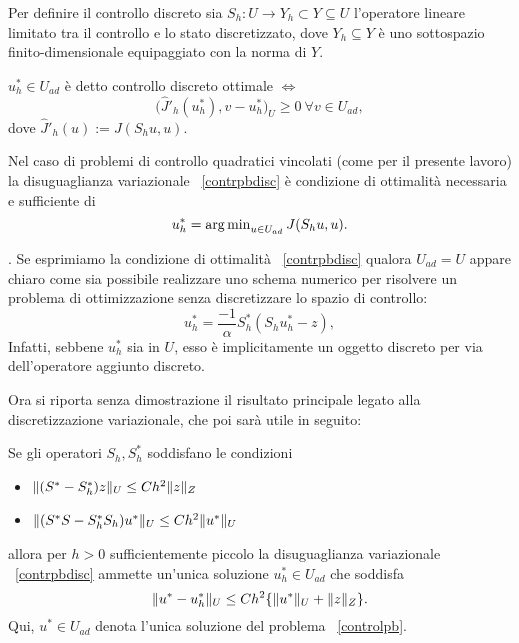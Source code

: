 Per definire il controllo discreto sia $ S_h:U\to Y_h\subset Y\subseteq U$ l'operatore lineare limitato tra il controllo e lo stato discretizzato, dove $ Y_h\subseteq Y $ è uno sottospazio finito-dimensionale equipaggiato con la norma di $ Y $.
\begin{definizione}

$ u^*_h\in U_{ad} $ è detto controllo discreto ottimale $ \iff $
\begin{equation}
\label{contrpbdisc}
\big( \hat{J}'_h(u^*_h),v-u^*_h\big)_U \ge 0 \ \forall v\in U_{ad},
\end{equation}
dove $ \hat{J}'_h(u):=J(S_h u,u) $.
\end{definizione}
\begin{osservazione}

Nel caso di problemi di controllo quadratici vincolati (come per il presente lavoro) la disuguaglianza variazionale ~\eqref{contrpbdisc} è condizione di ottimalità necessaria e sufficiente di 
\begin{equation}
u^{*}_{h}= \operatorname{arg\,min}_{u \in U_{ad}} J(S_hu,u).
\end{equation}

\end{osservazione}.
Se esprimiamo la condizione di ottimalità ~\eqref{contrpbdisc} qualora $ U_{ad}=U $ appare chiaro come sia possibile realizzare uno schema numerico per risolvere un problema di ottimizzazione senza discretizzare lo spazio di controllo:
\begin{equation}
u^*_h=\frac{-1}{\alpha}S^*_h(S_hu^*_h-z),
\end{equation}
Infatti, sebbene $ u^*_h $ sia in $ U $, esso è implicitamente un oggetto discreto per via dell'operatore aggiunto discreto.

Ora si riporta senza dimostrazione il risultato principale legato alla discretizzazione variazionale, che poi sarà utile in seguito: 
\begin{teorema}
\label{teo:Hin}

Se gli operatori $ S_h, S^*_h $ soddisfano le condizioni
\begin{itemize}

\item $ \lVert(S^*-S^*_h)z\rVert_U\le Ch^2\lVert z\rVert_Z $
\item $ \lVert(S^*S-S^*_hS_h)u^*\rVert_U\le Ch^2\lVert u^*\rVert_U $

\end{itemize}
allora per $ h>0 $ sufficientemente piccolo la disuguaglianza variazionale ~\eqref{contrpbdisc} ammette un'unica soluzione $ u^*_h\in U_{ad} $ che soddisfa 
\begin{equation}
\lVert u^*-u^*_h\rVert_U\le Ch^2\{ \lVert u^*\rVert_U + \lVert z\rVert_Z\}.
\label{controlteo}
\end{equation}
Qui, $ u^*\in U_{ad} $ denota l'unica soluzione del problema ~\eqref{controlpb}.

\end{teorema}

